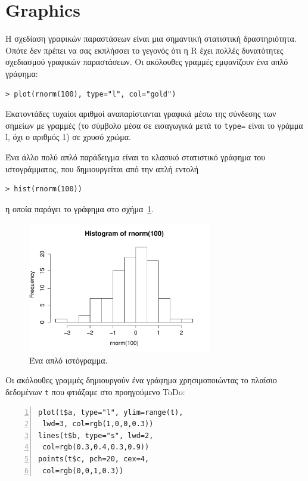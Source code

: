 \documentclass[a4paper,11pt,twocolumn,tablecaptionabove]{scrartcl}
\begin{document}
\section{Graphics}
\label{sec:some-plotting}

Η σχεδίαση γραφικών παραστάσεων είναι μια σημαντική στατιστική δραστηριότητα. Οπότε δεν πρέπει να σας εκπλήσσει
το γεγονός ότι η R έχει πολλές δυνατότητες σχεδιασμού γραφικών παραστάσεων. Οι ακόλουθες γραμμές εμφανίζουν ένα
απλό γράφημα:
\begin{Verbatim}[frame=single,gobble=0]
> plot(rnorm(100), type="l", col="gold")
\end{Verbatim}

\noindent Εκατοντάδες τυχαίοι αριθμοί αναπαρίστανται γραφικά μέσω της σύνδεσης των σημείων με γραμμές (το 
σύμβολο μέσα σε εισαγωγικά μετά το \texttt{type=} είναι το γράμμα l, όχι ο αριθμός 1) σε χρυσό χρώμα.

Ένα άλλο πολύ απλό παράδειγμα είναι το κλασικό στατιστικό γράφημα του ιστογράμματος, που δημιουργείται από
την απλή εντολή
\begin{Verbatim}[frame=single,gobble=0]
  > hist(rnorm(100))
\end{Verbatim}
η οποία παράγει το γράφημα στο σχήμα~\ref{fig:hist}.
\begin{figure}[h]
  \centering
  \includegraphics[width=8cm]{img/hist.pdf}
  \caption{Ένα απλό ιστόγραμμα.}
  \label{fig:hist}
\end{figure}

\noindent Οι ακόλουθες γραμμές δημιουργούν ένα γράφημα χρησιμοποιώντας το πλαίσιο δεδομένων \texttt{t} που 
φτιάξαμε στο προηγούμενο ToDo:
\begin{Verbatim}[frame=single,numbers=left,gobble=0, xleftmargin=0.35cm, numbersep=0.1cm]
plot(t$a, type="l", ylim=range(t), 
 lwd=3, col=rgb(1,0,0,0.3))
lines(t$b, type="s", lwd=2, 
 col=rgb(0.3,0.4,0.3,0.9))
points(t$c, pch=20, cex=4, 
 col=rgb(0,0,1,0.3))
\end{Verbatim} 
\end{document}
